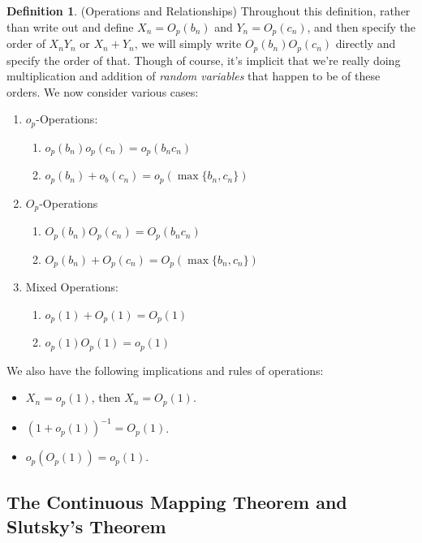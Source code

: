 \documentclass[12pt]{article}
\theoremstyle{plain}
\theoremstyle{definition}
\newtheorem{defn}[thm]{Definition}
\theoremstyle{remark}
\begin{document}
\clearpage
\begin{defn}(Operations and Relationships)
Throughout this definition, rather than write out and define $X_n =
O_p(b_n)$ and $Y_n=O_p(c_n)$, and then specify the order of $X_nY_n$ or
$X_n+Y_n$, we will simply write $O_p(b_n)O_p(c_n)$ directly and specify
the order of that. Though of course, it's implicit that we're really
doing multiplication and addition of \emph{random variables} that
happen to be of these orders. We now consider various cases:
\begin{enumerate}
  \item $o_p$-Operations:
    \begin{enumerate}
      \item $o_p(b_n)o_p(c_n)=o_p(b_nc_n)$
      \item $o_p(b_n)+o_b(c_n) = o_p(\max\{b_n, c_n\})$
    \end{enumerate}

  \item $O_p$-Operations
    \begin{enumerate}
      \item $O_p(b_n)O_p(c_n)=O_p(b_nc_n)$
      \item $O_p(b_n)+O_p(c_n) = O_p(\max\{b_n, c_n\})$
    \end{enumerate}

  \item Mixed Operations:
    \begin{enumerate}
      \item $o_p(1)+O_p(1) = O_p(1)$
      \item $o_p(1)O_p(1)=o_p(1)$
    \end{enumerate}
\end{enumerate}
We also have the following implications and rules of operations:
\begin{itemize}
  \item $X_n=o_p(1)$, then $X_n=O_p(1)$.
  \item $(1+o_p(1))^{-1}=O_p(1)$.
  \item $o_p(O_p(1))=o_p(1)$.
\end{itemize}
\end{defn}


\clearpage
\subsection{The Continuous Mapping Theorem and Slutsky's Theorem}
\end{document}
